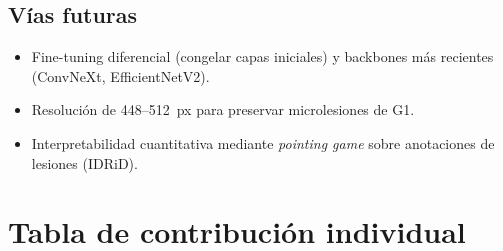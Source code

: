 \documentclass[12pt, a4paper]{article}
\begin{document}
\subsection{Vías futuras}
\begin{itemize}
  \item Fine-tuning diferencial (congelar capas iniciales) y backbones
        más recientes (ConvNeXt, EfficientNetV2).
  \item Resolución de 448--512~px para preservar microlesiones de G1.
  \item Interpretabilidad cuantitativa mediante \textit{pointing game}
        sobre anotaciones de lesiones (IDRiD).
\end{itemize}

\newpage
\printbibliography[heading=bibintoc, title={Bibliografía}]

\newpage
\appendix
\section{Tabla de contribución individual}
\label{sec:contribucion}
\end{document}

